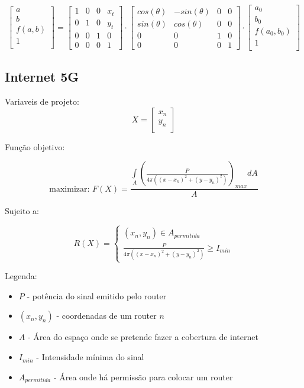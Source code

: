 \documentclass[11pt,a4paper]{article}
\begin{document}
$$
\begin{bmatrix}
a\\
b\\
f(a,b)\\
1\\
\end{bmatrix}
=
\begin{bmatrix}
1 & 0 & 0 & x_t\\
0 & 1 & 0 & y_t\\
0 & 0 & 1 & 0\\
0 & 0 & 0 & 1
\end{bmatrix}
\cdot
\begin{bmatrix}
cos(\theta) & -sin(\theta) & 0 & 0\\
sin(\theta) & cos(\theta) & 0 & 0\\
0 & 0 & 1 & 0\\
0 & 0 & 0 & 1
\end{bmatrix}
\cdot
\begin{bmatrix}
a_0\\
b_0\\
f(a_0,b_0)\\
1\\
\end{bmatrix}
$$


\subsection{Internet 5G}

Variaveis de projeto:
$$ X = 
\begin{bmatrix}
    x_n \\
    y_n \\
\end{bmatrix}
$$

Função objetivo:

$$
\text{maximizar: } 
F(X) = \frac{
\displaystyle\int\limits_A
\left(
\frac{P}{4 \pi \left( ( x-x_n ) ^2 + ( y-y_n ) ^2 \right) } 
\right)_{max} dA }{A}
$$

Sujeito a:

$$
R(X) = \left
\{ \begin{matrix} 
(x_n,y_n) \in A_{permitida} \\ 
\frac{P}{4 \pi \left( ( x-x_n ) ^2 + ( y-y_n ) ^2 \right) } \geq I_{min} \end{matrix} 
\right.
$$


Legenda:
\begin{itemize}
\item $P$ - potência do sinal emitido pelo router
\item $(x_n,y_n)$ - coordenadas de um router $n$
\item $A$ - Área do espaço onde se pretende fazer a cobertura de internet
\item $I_{min}$ - Intensidade mínima do sinal
\item $A_{permitida}$ - Área onde há permissão para colocar um router
\end{itemize}
\end{document}
